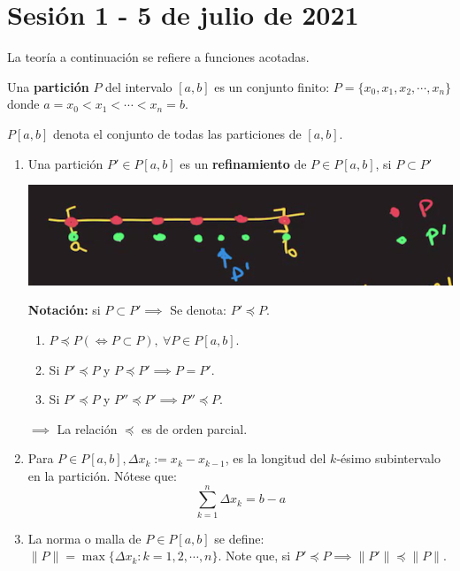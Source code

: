 \section{Sesión 1 - 5 de julio de 2021}

\begin{nota}
	La teoría a continuación se refiere a funciones acotadas.
\end{nota}

\begin{definicion}
	Una \textbf{partición} $P$ del intervalo $[a,b]$ es un conjunto finito: $P=\{x_0,x_1,x_2,\cdots, x_n\}$ donde $a=x_0<x_1<\cdots < x_n=b$. 
\end{definicion}

\begin{nota}
	$P[a,b]$ denota el conjunto de todas las particiones de $[a,b]$. 
\end{nota}

\begin{nota}
	\begin{enumerate}
		\item Una partición $P'\in P[a,b]$ es un \textbf{refinamiento} de $P\in P[a,b]$, si $P\subset P'$ 
		\begin{center}
			\includegraphics[scale=0.5]{images/1/1}
		\end{center}
	\textbf{Notación:} si $P\subset P'\implies$ Se denota: $P'\preceq P$. 
	\begin{enumerate}
		\item $P\preceq P (\iff P\subset P), \ \forall P\in P[a,b]$. 
		\item Si $P'\preceq P$ y $P\preceq P'\implies P=P'$. 
		\item Si $P'\preceq P$ y $P''\preceq P'\implies P''\preceq P$. 
	\end{enumerate}
$\implies$ La relación $\preceq$ es de orden parcial. 
\item Para $P\in P[a,b], \Delta x_k:=x_k-x_{k-1}$, es la longitud del $k$-ésimo subintervalo en la partición. Nótese que: 
$$\sum_{k=1}^{n}\Delta x_k=b-a$$
\item La norma o malla de $P\in P[a,b]$ se define:  $\lVert P \rVert =\max\{\Delta x_k:k=1,2,\cdots, n\}$. Note que, si $P'\preceq P\implies \lVert P'\rVert \preceq \lVert P\rVert$.
	\end{enumerate}
\end{nota} 


